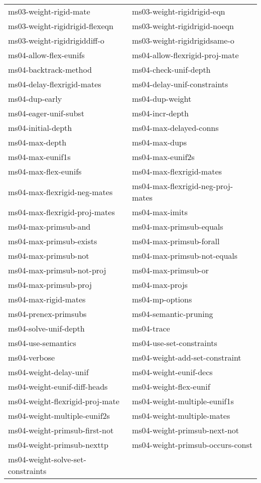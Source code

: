 \begin{description}
\begin{tabular}{l l}
ms03-weight-rigid-mate&ms03-weight-rigidrigid-eqn\\
ms03-weight-rigidrigid-flexeqn&ms03-weight-rigidrigid-noeqn\\
ms03-weight-rigidrigiddiff-o&ms03-weight-rigidrigidsame-o\\
ms04-allow-flex-eunifs&ms04-allow-flexrigid-proj-mate\\
ms04-backtrack-method&ms04-check-unif-depth\\
ms04-delay-flexrigid-mates&ms04-delay-unif-constraints\\
ms04-dup-early&ms04-dup-weight\\
ms04-eager-unif-subst&ms04-incr-depth\\
ms04-initial-depth&ms04-max-delayed-conns\\
ms04-max-depth&ms04-max-dups\\
ms04-max-eunif1s&ms04-max-eunif2s\\
ms04-max-flex-eunifs&ms04-max-flexrigid-mates\\
ms04-max-flexrigid-neg-mates&ms04-max-flexrigid-neg-proj-mates\\
ms04-max-flexrigid-proj-mates&ms04-max-imits\\
ms04-max-primsub-and&ms04-max-primsub-equals\\
ms04-max-primsub-exists&ms04-max-primsub-forall\\
ms04-max-primsub-not&ms04-max-primsub-not-equals\\
ms04-max-primsub-not-proj&ms04-max-primsub-or\\
ms04-max-primsub-proj&ms04-max-projs\\
ms04-max-rigid-mates&ms04-mp-options\\
ms04-prenex-primsubs&ms04-semantic-pruning\\
ms04-solve-unif-depth&ms04-trace\\
ms04-use-semantics&ms04-use-set-constraints\\
ms04-verbose&ms04-weight-add-set-constraint\\
ms04-weight-delay-unif&ms04-weight-eunif-decs\\
ms04-weight-eunif-diff-heads&ms04-weight-flex-eunif\\
ms04-weight-flexrigid-proj-mate&ms04-weight-multiple-eunif1s\\
ms04-weight-multiple-eunif2s&ms04-weight-multiple-mates\\
ms04-weight-primsub-first-not&ms04-weight-primsub-next-not\\
ms04-weight-primsub-nexttp&ms04-weight-primsub-occurs-const\\
ms04-weight-solve-set-constraints
\end{tabular}


\end{description}

